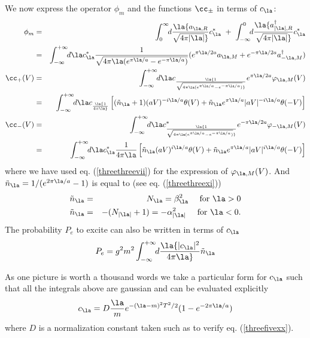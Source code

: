 \documentclass[12pt]{article}
\begin{document}
We now express the operator $\phi_m$ and the
functions  $\cc_\pm$
 in terms of
$c_\la$:
\begin{eqnarray}
\phi_m &=& \int_0^\infty\!\! d \la  {a_{\la,R} \over \sqrt{4
\pi \vert \la \vert }}c_\la^*  \ + \  \int_{-\infty}^0\!\! d \la
{a_{\vert\la\vert,R}^\dagger  \over \sqrt{4 \pi \vert \la \vert }}c_\la^*
\nonumber\\ &=&\int_{-\infty}^{+\infty}\!\! d\la c_\la^* {1 \over \sqrt{4 \pi
\la (e^{\pi \la/a} - e^{-\pi \la /a})}}  (e^{\pi \la/2a} a_{\la,M} + e^{-\pi
\la/2a} a_{-\la,M}^\dagger ) \nonumber\\
\cc_+(V) &=&
\int_{-\infty}^{+\infty}\!\! d\la c_\la {1 \over \sqrt{4 \pi  \la (e^{\pi
\la/a} - e^{-\pi \la /a})}}
 e^{\pi \la/2a} \varphi_{\la,M}(V) \nonumber\\  &=&
\int_{-\infty}^{+\infty}\!\! d\la c_\la
{1 \over 4 \pi  \la}  \left[
( \tilde n_\la + 1) (aV)^{-i\la/a} \theta(V) +
\tilde n_\la e^{\pi \la/a}
\vert aV \vert^{- i\la/a} \theta(-V)
\right]\nonumber\\
 \cc_-(V)  &=&
\int_{-\infty}^{+\infty}\!\! d\la c^*_\la {1 \over \sqrt{4 \pi  \la (e^{\pi
\la/a} - e^{-\pi \la /a})}}
 e^{-\pi \la/2a} \varphi_{-\la,M}(V)\nonumber\\
 &=& \int_{-\infty}^{+\infty}\!\! d\la c_\la^*
{1 \over 4 \pi \la}
\left[ \tilde n_\la  (aV)^{i\la/a} \theta(V) +
\tilde n_\la e^{\pi \la/a} \vert aV \vert^{i\la/a} \theta(-V)
\right] \label{threefivexxiii} \end{eqnarray}
where we have used eq. (\ref{threethreevii})
for the expression of $\varphi_{\la,M}(V)$.
And
$\tilde n_\la = 1/ (e^{2 \pi \la/a}-1)$
is equal to (see eq. (\ref{threethreexi}))
\begin{eqnarray} \tilde n_\la &=&N_{\la}= \beta_{\la}^2
\quad \hbox{ for $\la > 0$}\nonumber\\
\tilde n_\la &=&-(N_{\vert\la\vert}+1)= -\alpha_{\vert\la\vert}^2
\quad \hbox{ for $\la
< 0$.} \end{eqnarray}
The probability $P_{e}$ to excite can also be written
in terms of $c_\la$
\begin{equation} P_{e} = g^2 m^2
\int_{-\infty}^{+\infty}\!\! d\la { \vert c_\la \vert^2 \over 4 \pi \la}
\tilde n_\la  \label{threefivexxiv} \end{equation}

As one picture is worth a thousand words we take a particular form for
$c_\la$ such that all the integrals above are gaussian and  can be
evaluated explicitly
\begin{equation}  c_\la = D { \la \over m} e^{-(\la - m )^2 T^2 /2}
 (1 -
e^{-2\pi \la /a})
 \label{threefivexxv} \end {equation} where $D$ is a
normalization constant taken such as to verify eq. (\ref{threefivexx}).
\end{document}
